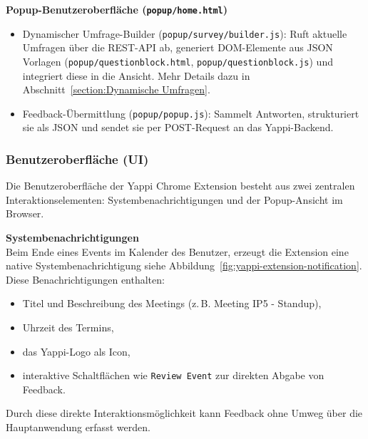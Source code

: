 \documentclass[12pt,a4paper]{report}
\begin{document}
        \textbf{Popup-Benutzeroberfläche (\texttt{popup/home.html})} \\
            \begin{itemize}
              \item Dynamischer Umfrage-Builder (\texttt{popup/survey/builder.js}):
                    Ruft aktuelle Umfragen über die REST-API ab, generiert DOM-Elemente aus JSON Vorlagen (\texttt{popup/questionblock.html},
                    \texttt{popup/questionblock.js}) und integriert diese in die Ansicht.
                    Mehr Details dazu in Abschnitt~\ref{section:Dynamische Umfragen}.
              \item Feedback-Übermittlung (\texttt{popup/popup.js}):
                    Sammelt Antworten, strukturiert sie als JSON und sendet sie per POST-Request an das Yappi-Backend.
            \end{itemize}


    \subsubsection{Benutzeroberfläche (UI)}
        Die Benutzeroberfläche der Yappi Chrome Extension besteht aus zwei zentralen Interaktionselementen: Systembenachrichtigungen und der Popup-Ansicht im Browser.

        \textbf{Systembenachrichtigungen} \\
            Beim Ende eines Events im Kalender des Benutzer, erzeugt die Extension eine native Systembenachrichtigung siehe Abbildung~\ref{fig:yappi-extension-notification}.
            Diese Benachrichtigungen enthalten:
            \begin{itemize}
                \item Titel und Beschreibung des Meetings (z.\,B. \glqq Meeting IP5 - Standup\grqq),
                \item Uhrzeit des Termins,
                \item das Yappi-Logo als Icon,
                \item interaktive Schaltflächen wie \texttt{Review Event} zur direkten Abgabe von Feedback.
            \end{itemize}
            Durch diese direkte Interaktionsmöglichkeit kann Feedback ohne Umweg über die Hauptanwendung erfasst werden.
\end{document}
